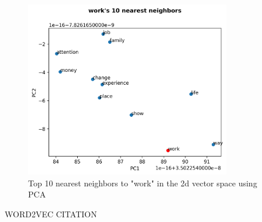 \documentclass[12pt,letterpaper]{article}
\begin{document}
\begin{figure}[H]
\begin{center}
  \includegraphics[width=0.8\textwidth]{../graphs/work_neighbors.png}
\end{center}
\caption{Top 10 nearest neighbors to "work" in the 2d vector space using PCA}
\end{figure}


\begin{thebibliography}{9}
WORD2VEC CITATION
\end{thebibliography}
\end{document}
